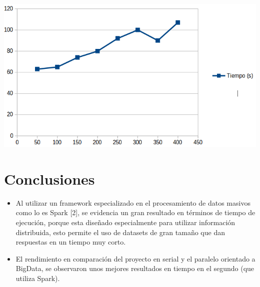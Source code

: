 \includegraphics[scale=0.4]{tiempos}


%
%
%

\section{Conclusiones}
\begin{itemize}
\item Al utilizar un framework especializado en el procesamiento de datos masivos como lo es Spark [2], se evidencia un gran resultado en términos de tiempo de ejecución, porque esta diseñado especialmente para utilizar información distribuida, esto permite el uso de datasets de gran tamaño que dan respuestas en un tiempo muy corto.
\item El rendimiento en comparación del proyecto en serial y el paralelo orientado a BigData, se observaron unos mejores resultados en tiempo en el segundo (que utiliza Spark).
\end{itemize}

